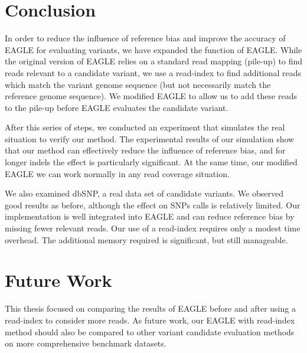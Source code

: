 \hspace{24pt}

\section{Conclusion}
In order to reduce the influence of reference bias and improve the accuracy of EAGLE for evaluating variants, we have expanded the function of EAGLE.  While the original version of EAGLE relies on a standard read mapping (pile-up) to find reads relevant to a candidate variant, we use a read-index to find additional reads which match the variant genome sequence (but not necessarily match the reference genome sequence).  We modified EAGLE to allow us to add these reads to the pile-up before EAGLE evaluates the candidate variant.

After this series of steps, we conducted an experiment that simulates the real situation to verify our method. The experimental results of our simulation show that our method can effectively reduce the influence of reference bias, and for longer indels the effect is particularly significant. At the same time, our modified EAGLE we can work normally in any read coverage situation.

We also examined dbSNP, a real data set of candidate variants.  We observed good results as before, although the effect on SNPs calls is relatively limited.  Our implementation is well integrated into EAGLE and can reduce reference bias by missing fewer relevant reads.  Our use of a read-index requires only a modest time overhead.  The additional memory required is significant, but still manageable.

\section{Future Work}
This thesis focused on comparing the results of EAGLE before and after using a read-index to consider more reads.
As future work, our EAGLE with read-index method should also be compared to other variant candidate evaluation methods on
more comprehensive benchmark datasets.
